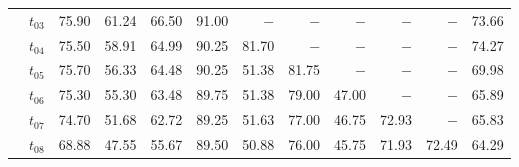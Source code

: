 \begin{table}[ht]
\begin{tabular}{@{}l l r r r r r r r r r r@{}}
 & $t_{03}$ & 75.90 & 61.24 & 66.50 & 91.00 & $-$ & $-$ & $-$ & $-$ & $-$ & 73.66 \\
 & $t_{04}$ & 75.50 & 58.91 & 64.99 & 90.25 & 81.70 & $-$ & $-$ & $-$ & $-$ & 74.27 \\
 & $t_{05}$ & 75.70 & 56.33 & 64.48 & 90.25 & 51.38 & 81.75 & $-$ & $-$ & $-$ & 69.98 \\
 & $t_{06}$ & 75.30 & 55.30 & 63.48 & 89.75 & 51.38 & 79.00 & 47.00 & $-$ & $-$ & 65.89 \\
 & $t_{07}$ & 74.70 & 51.68 & 62.72 & 89.25 & 51.63 & 77.00 & 46.75 & 72.93 & $-$ & 65.83 \\
 & $t_{08}$ & 68.88 & 47.55 & 55.67 & 89.50 & 50.88 & 76.00 & 45.75 & 71.93 & 72.49 & 64.29 \\
\bottomrule
\end{tabular}
\end{table}

